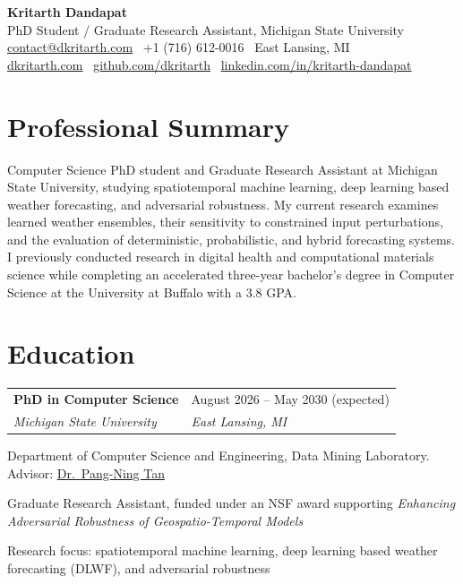 \documentclass[11pt,a4paper]{article}
\makeatletter
\newcommand{\roleentry}[4]{%
  \vspace{0.5em}%
  \begin{tabular*}{\textwidth}{@{\extracolsep{\fill}} ll}
    \textbf{#1} & #2 \\
    \textit{#3} & \textit{#4} \\
  \end{tabular*}%
  \vspace{0.15em}%
}
\makeatother
\begin{document}
\begin{center}
  {\LARGE\bfseries\color{dark} Kritarth Dandapat}\\[0.3em]
  {\small PhD Student / Graduate Research Assistant, Michigan State University}\\[0.2em]
  {\small \href{mailto:contact@dkritarth.com}{contact@dkritarth.com}
   \textbar\ +1 (716) 612-0016
   \textbar\ East Lansing, MI}\\[0.2em]
  {\small
   \href{https://dkritarth.com}{dkritarth.com} \textbar\
   \href{https://github.com/dkritarth}{github.com/dkritarth} \textbar\
   \href{https://www.linkedin.com/in/kritarth-dandapat}{linkedin.com/in/kritarth-dandapat}}
\end{center}
\vspace{0.3em}

\section*{Professional Summary}
Computer Science PhD student and Graduate Research Assistant at Michigan State University, studying spatiotemporal machine learning, deep learning based weather forecasting, and adversarial robustness. My current research examines learned weather ensembles, their sensitivity to constrained input perturbations, and the evaluation of deterministic, probabilistic, and hybrid forecasting systems. I previously conducted research in digital health and computational materials science while completing an accelerated three-year bachelor's degree in Computer Science at the University at Buffalo with a 3.8 GPA.

\section*{Education}

\roleentry{PhD in Computer Science}{August 2026 -- May 2030 (expected)}{Michigan State University}{East Lansing, MI}
\begin{cvlist}
  \item Department of Computer Science and Engineering, Data Mining Laboratory. Advisor: \href{https://www.cse.msu.edu/~ptan/}{Dr.\ Pang-Ning Tan}
  \item Graduate Research Assistant, funded under an NSF award supporting \textit{Enhancing Adversarial Robustness of Geospatio-Temporal Models}
  \item Research focus: spatiotemporal machine learning, deep learning based weather forecasting (DLWF), and adversarial robustness
\end{cvlist}
\end{document}
